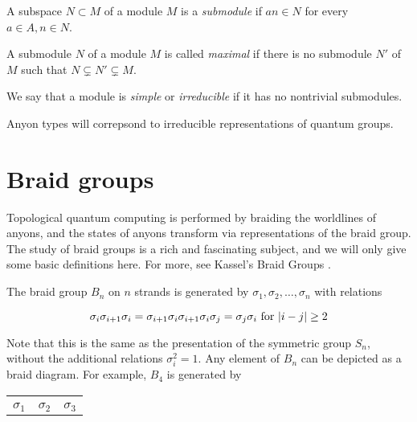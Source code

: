 \begin{defn}
    A subspace $N \subset M$ of a module $M$ is a \emph{submodule} if $an \in
    N$ for every $a \in A, n\in N$.
\end{defn}

\begin{defn}
    A submodule $N$ of a module $M$ is called \emph{maximal} if there is no
    submodule $N'$ of $M$ such that $N \subsetneq N' \subsetneq M$.
\end{defn}

\begin{defn}
    We say that a module is \emph{simple} or \emph{irreducible} if it has no
    nontrivial submodules.
\end{defn}

Anyon types will correpsond to irreducible representations of quantum groups.

\section{Braid groups}

Topological quantum computing is performed by braiding the worldlines of
anyons, and the states of anyons transform via representations of the braid
group.  The study of braid groups is a rich and fascinating subject, and we
will only give some basic definitions here. For more, see Kassel's Braid Groups
\cite{KasselBraid}.

The braid group $B_n$ on $n$ strands is generated by $\sigma_1, \sigma_2,
    \ldots, \sigma_n$ with relations

\begin{equation}
    \sigma_i \sigma_{i+1} \sigma_i = \sigma_{i+1} \sigma_i \sigma_{i+1} \\
    \sigma_i \sigma_j  = \sigma_j \sigma_i \text{ for $|i-j| \geq 2$}
\end{equation}

Note that this is the same as the presentation of the symmetric group $S_n$,
without the additional relations $\sigma_i^2 = 1$. Any element of $B_n$
can be depicted as a braid diagram. For example, $B_4$ is generated by

\begin{center}
\begin{tabular}{SSS}
&
&
\\
$\sigma_1$ & $\sigma_2$ & $\sigma_3$
\end{tabular}
\end{center}

